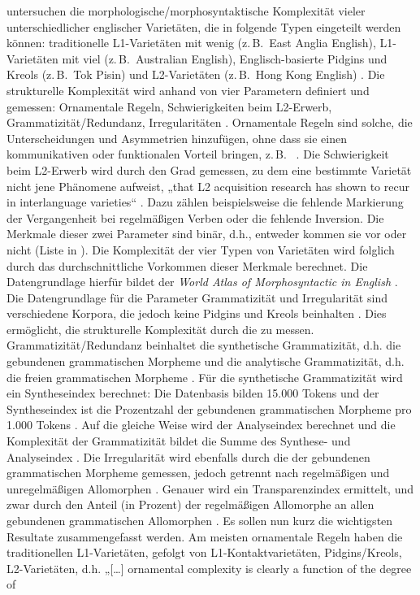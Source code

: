 \citet{SzmrecsanyiKortmann2009} untersuchen die morphologische/morphosyntaktische Komplexität vieler unterschiedlicher englischer Varietäten, die in folgende Typen eingeteilt werden können: traditionelle L1-Va\-rie\-tä\-ten mit wenig  (z.\,B.\ East Anglia English), L1-Va\-rie\-tä\-ten mit viel  (z.\,B.\ Australian English), Englisch-basierte Pidgins und Kreols (z.\,B.\ Tok Pisin) und L2-Va\-rie\-tä\-ten (z.\,B.\ Hong Kong English) \citep[64–65]{SzmrecsanyiKortmann2009}. Die strukturelle Komplexität wird anhand von vier Parametern definiert und gemessen: Ornamentale Regeln, Schwierigkeiten beim L2-Er\-werb, Grammatizität/Redundanz, Irregularitäten \citep[64–65]{SzmrecsanyiKortmann2009}. Ornamentale Regeln sind solche, die Unterscheidungen und Asymmetrien hinzufügen, ohne dass sie einen kommunikativen oder funktionalen Vorteil bringen, z.\,B.\  \citep[68]{SzmrecsanyiKortmann2009}. Die Schwierigkeit beim L2-Er\-werb wird durch den Grad gemessen, zu dem eine bestimmte Varietät nicht jene Phänomene aufweist, „that L2 acquisition research has shown to recur in interlanguage varieties“ \citep[69]{SzmrecsanyiKortmann2009}. Dazu zählen beispielsweise die fehlende Markierung der Vergangenheit bei regelmäßigen Verben oder die fehlende Inversion. Die Merkmale dieser zwei Parameter sind binär, d.h., entweder kommen sie vor oder nicht (Liste in \citealt[69–71]{SzmrecsanyiKortmann2009}). Die Komplexität der vier Typen von Varietäten wird folglich durch das durchschnittliche Vorkommen dieser Merkmale berechnet. Die Datengrundlage hierfür bildet der \textit{World Atlas of Morphosyntactic  in English} \citep[65--66]{SzmrecsanyiKortmann2009}. Die Datengrundlage für die Parameter Grammatizität und Irregularität sind verschiedene Korpora, die jedoch keine Pidgins und Kreols beinhalten \citep[67]{SzmrecsanyiKortmann2009}. Dies ermöglicht, die strukturelle Komplexität durch die  zu messen. Grammatizität/Redundanz beinhaltet die synthetische Grammatizität, d.h. die gebundenen grammatischen Morpheme und die analytische Grammatizität, d.h. die freien grammatischen Morpheme \citep[71--72]{SzmrecsanyiKortmann2009}. Für die synthetische Grammatizität wird ein Syntheseindex berechnet: Die Datenbasis bilden 15.000 Tokens und der Syntheseindex ist die Prozentzahl der gebundenen grammatischen Morpheme pro 1.000 Tokens \citep[72]{SzmrecsanyiKortmann2009}. Auf die gleiche Weise wird der Analyseindex berechnet und die Komplexität der Grammatizität bildet die Summe des Synthese- und Analyseindex \citep[72]{SzmrecsanyiKortmann2009}. Die Irregularität wird ebenfalls durch die  der gebundenen grammatischen Morpheme gemessen, jedoch getrennt nach regelmäßigen und unregelmäßigen Allomorphen \citep[74]{SzmrecsanyiKortmann2009}. Genauer wird ein Transparenzindex ermittelt, und zwar durch den Anteil (in Prozent) der regelmäßigen Allomorphe an allen gebundenen grammatischen Allomorphen \citep[74]{SzmrecsanyiKortmann2009}. Es sollen nun kurz die wichtigsten Resultate zusammengefasst werden. Am meisten ornamentale Regeln haben die traditionellen L1-Va\-rie\-tä\-ten, gefolgt von L1-Kon\-takt\-va\-rie\-tä\-ten, Pi\-dgins/Kreols, L2-Va\-rie\-tä\-ten, d.h. „[…] ornamental complexity is clearly a function of the degree of 